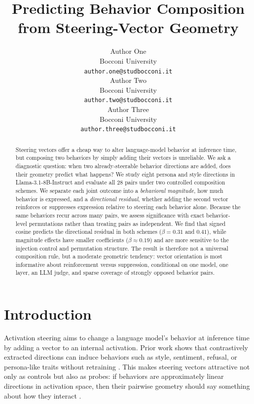 \documentclass{article}
\title{Predicting Behavior Composition from Steering-Vector Geometry}
\author{%
  Author One \\
  Bocconi University \\
  \texttt{author.one@studbocconi.it} \\
  \And
  Author Two \\
  Bocconi University \\
  \texttt{author.two@studbocconi.it} \\
  \And
  Author Three \\
  Bocconi University \\
  \texttt{author.three@studbocconi.it} \\
}
\begin{document}
\maketitle

\begin{abstract}
Steering vectors offer a cheap way to alter language-model behavior at inference time, but
composing two behaviors by simply adding their vectors is unreliable. We ask a diagnostic question:
when two already-steerable behavior directions are added, does their geometry predict what happens?
We study eight persona and style directions in Llama-3.1-8B-Instruct and evaluate all $28$ pairs
under two controlled composition schemes. We separate each joint outcome into a \emph{behavioral
magnitude}, how much behavior is expressed, and a \emph{directional residual}, whether adding the
second vector reinforces or suppresses expression relative to steering each behavior alone. Because
the same behaviors recur across many pairs, we assess significance with exact behavior-level
permutations rather than treating pairs as independent. We find that signed cosine predicts the directional
residual in both schemes ($\beta=0.31$ and $0.41$), while magnitude effects have smaller
coefficients ($\beta\approx0.19$) and are more sensitive to the injection control and permutation
structure. The result is therefore not a universal composition rule, but a moderate geometric
tendency: vector orientation is most informative about reinforcement versus suppression, conditional
on one model, one layer, an LLM judge, and sparse coverage of strongly opposed behavior pairs.
\end{abstract}

\section{Introduction}

Activation steering aims to change a language model's behavior at inference time by adding a
vector to an internal activation. Prior work shows that contrastively extracted directions can
induce behaviors such as style, sentiment, refusal, or persona-like traits without retraining
\citep{turner2023actadd,zou2023repe,panickssery2024caa,chen2025persona}. This makes steering
vectors attractive not only as controls but also as probes: if behaviors are approximately linear
directions in activation space, then their pairwise geometry should say something about how they
interact \citep{park2024linear}.
\end{document}
